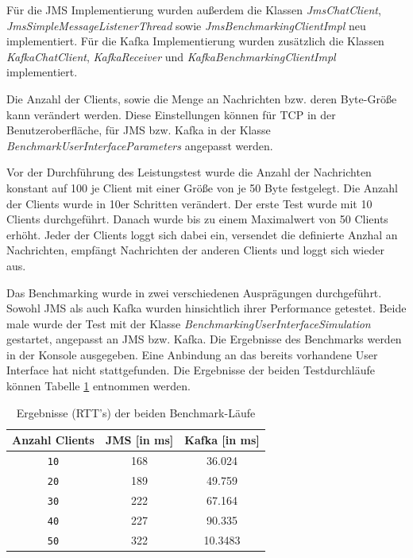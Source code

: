 \documentclass[10pt,journal,compsoc]{IEEEtran}
\begin{document}
Für die JMS Implementierung wurden außerdem die Klassen \textit{JmsChatClient}, \textit{JmsSimpleMessageListenerThread} sowie \textit{JmsBenchmarkingClientImpl} neu implementiert.
Für die Kafka Implementierung wurden zusätzlich die Klassen \textit{KafkaChatClient}, \textit{KafkaReceiver} und \textit{KafkaBenchmarkingClientImpl} implementiert.

Die Anzahl der Clients, sowie die Menge an Nachrichten bzw. deren Byte-Größe kann verändert werden. Diese Einstellungen können für TCP in der Benutzeroberfläche, für JMS bzw. Kafka in der Klasse \textit{BenchmarkUserInterfaceParameters} angepasst werden.

Vor der Durchführung des Leistungstest wurde die Anzahl der Nachrichten konstant auf 100 je Client mit einer Größe von je 50 Byte festgelegt. Die Anzahl der Clients wurde in 10er Schritten verändert. Der erste Test wurde mit 10 Clients durchgeführt. Danach wurde bis zu einem Maximalwert von 50 Clients erhöht. Jeder der Clients loggt sich dabei ein, versendet die definierte Anzhal an Nachrichten, empfängt Nachrichten der anderen Clients und loggt sich wieder aus.

Das Benchmarking wurde in zwei verschiedenen Ausprägungen durchgeführt. Sowohl JMS als auch Kafka wurden hinsichtlich ihrer Performance getestet. Beide male wurde der Test mit der Klasse \textit{BenchmarkingUserInterfaceSimulation} gestartet, angepasst an JMS bzw. Kafka. Die Ergebnisse des Benchmarks werden in der Konsole ausgegeben. Eine Anbindung an das bereits vorhandene User Interface hat nicht stattgefunden. Die Ergebnisse der beiden Testdurchläufe können Tabelle \ref{tab:Benchmark} entnommen werden. 

\begin{table}[h!]
	\caption{Ergebnisse (RTT's) der beiden Benchmark-Läufe}
	\label{tab:Benchmark}
	\def\arraystretch{1,2} %
	\centering
	\begin{tabular}{|c||c||c|}\hline
		\textbf{Anzahl Clients} & \textbf{JMS [in ms]} & \textbf{Kafka [in ms]} \\\hline
		\lstinline|10|          & 168   & 36.024 \\\hline	
		\lstinline|20|      	& 189	& 49.759   \\\hline
		\lstinline|30|        	& 222	& 67.164	\\\hline
		\lstinline|40|       	& 227  	& 90.335    \\\hline
		\lstinline|50|       	& 322   & 10.3483   \\\hline
	\end{tabular} 
\end{table}
\end{document}
